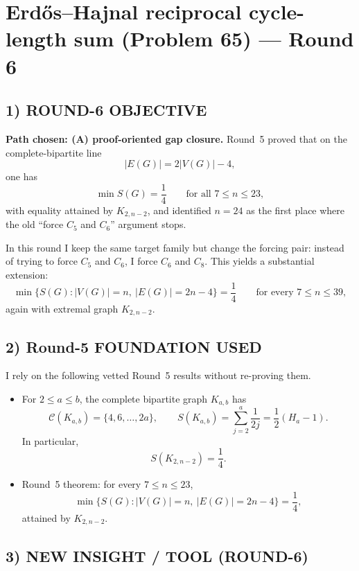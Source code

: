\section{Erd\H{o}s--Hajnal reciprocal cycle-length sum (Problem 65) --- Round 6}

\subsection*{1) ROUND-6 OBJECTIVE}

\textbf{Path chosen: (A) proof-oriented gap closure.}
Round~5 proved that on the complete-bipartite line
\[
|E(G)|=2|V(G)|-4,
\]
one has
\[
\min S(G)=\frac14
\qquad\text{for all }7\le n\le 23,
\]
with equality attained by $K_{2,n-2}$, and identified $n=24$ as the first place where the old ``force $C_5$ and $C_6$'' argument stops.

In this round I keep the same target family but change the forcing pair: instead of trying to force $C_5$ and $C_6$, I force $C_6$ and $C_8$.
This yields a substantial extension:
\[
\min\{S(G): |V(G)|=n,\ |E(G)|=2n-4\}=\frac14
\qquad\text{for every }7\le n\le 39,
\]
again with extremal graph $K_{2,n-2}$.

\subsection*{2) Round-5 FOUNDATION USED}

I rely on the following vetted Round~5 results without re-proving them.

\begin{itemize}
\item[(F1)] For $2\le a\le b$, the complete bipartite graph $K_{a,b}$ has
\[
\mathcal C(K_{a,b})=\{4,6,\dots,2a\},
\qquad
S(K_{a,b})=\sum_{j=2}^a\frac1{2j}=\frac12(H_a-1).
\]
In particular,
\[
S(K_{2,n-2})=\frac14.
\]

\item[(F2)] Round~5 theorem: for every $7\le n\le 23$,
\[
\min\{S(G): |V(G)|=n,\ |E(G)|=2n-4\}=\frac14,
\]
attained by $K_{2,n-2}$.
\end{itemize}

\subsection*{3) NEW INSIGHT / TOOL (ROUND-6)}

